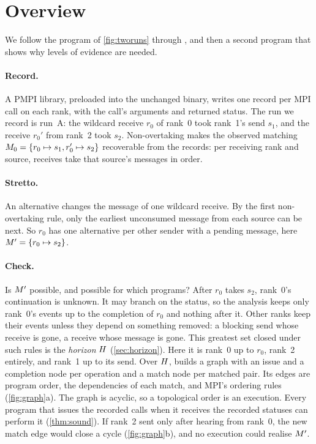 \section{Overview}
\label{sec:overview}

We follow the program of \cref{fig:tworuns} through \tool, and then a second program
that shows why levels of evidence are needed.

\paragraph{Record.} A PMPI library, preloaded into the unchanged binary, writes one
record per MPI call on each rank, with the call's arguments and returned status. The run
we record is run~A: the wildcard receive $r_0$ of rank~0 took rank~1's send $s_1$, and
the receive $r_0'$ from rank~2 took $s_2$. Non-overtaking makes the observed matching
$M_0 = \{r_0 \mapsto s_1, r_0' \mapsto s_2\}$ recoverable from the records: per
receiving rank and source, receives take that source's messages in order.

\paragraph{Stretto.} An alternative changes the message of one wildcard receive. By the
first non-overtaking rule, only the earliest unconsumed message from each source can be
next. So $r_0$ has one alternative per other sender with a pending message, here
$M' = \{r_0 \mapsto s_2\}$.

\paragraph{Check.} Is $M'$ possible, and possible for which programs? After $r_0$
takes $s_2$, rank~0's continuation is unknown. It may branch on the status, so the
analysis keeps only rank~0's events up to the completion of $r_0$ and nothing after it.
Other ranks keep their events unless they depend on something removed: a blocking send
whose receive is gone, a receive whose message is gone. This greatest set closed under
such rules is the \emph{horizon} $H$ (\cref{sec:horizon}). Here it is rank~0 up to
$r_0$, rank~2 entirely, and rank~1 up to its send. Over $H$, \tool builds a
graph with an issue and a completion node per operation and a match node per matched
pair. Its edges are program order, the dependencies of each match, and MPI's ordering
rules (\cref{fig:graph}a). The graph is acyclic, so a topological order is an execution.
Every program that issues the recorded calls when it receives the recorded statuses can
perform it (\cref{thm:sound}). If rank~2 sent only after hearing from rank~0, the new
match edge would close a cycle (\cref{fig:graph}b), and no execution could realise
$M'$.

